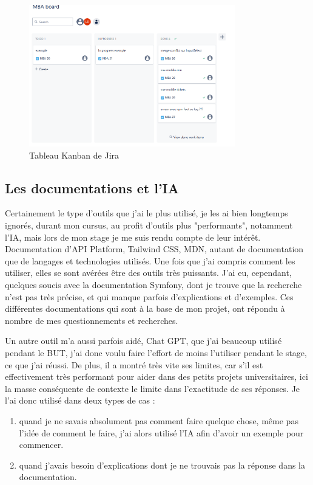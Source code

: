\documentclass[a4paper,12pt]{report}
\begin{document}
\begin{figure}[H]
    \centering
    \includegraphics[width=0.8\textwidth]{kanban.png}
    \caption{Tableau Kanban de Jira}
    \label{fig:kanban-jira}
\end{figure}

\subsection{Les documentations et l'IA}
Certainement le type d'outils que j'ai le plus utilisé, je les ai bien longtemps ignorés, durant mon cursus, au profit d'outils plus "performants", notamment l'IA, mais lors de mon stage je me suis rendu compte de leur intérêt. Documentation d'API Platform, Tailwind CSS, MDN, autant de documentation que de langages et technologies utilisés. Une fois que j'ai compris comment les utiliser, elles se sont avérées être des outils très puissants. J'ai eu, cependant, quelques soucis avec la documentation Symfony, dont je trouve que la recherche n'est pas très précise, et qui manque parfois d'explications et d'exemples. Ces différentes documentations qui sont à la base de mon projet, ont répondu à nombre de mes questionnements et recherches.

Un autre outil m'a aussi parfois aidé, Chat GPT, que j'ai beaucoup utilisé pendant le BUT, j'ai donc voulu faire l'effort de moins l'utiliser pendant le stage, ce que j'ai réussi. De plus, il a montré très vite ses limites, car s'il est effectivement très performant pour aider dans des petits projets universitaires, ici la masse conséquente de contexte le limite dans l'exactitude de ses réponses. Je l'ai donc utilisé dans deux types de cas :
\begin{enumerate}
    \item quand je ne savais absolument pas comment faire quelque chose, même pas l'idée de comment le faire, j'ai alors utilisé l'IA afin d'avoir un exemple pour commencer.
    \item quand j'avais besoin d'explications dont je ne trouvais pas la réponse dans la documentation.
\end{enumerate}
 
\end{document}
